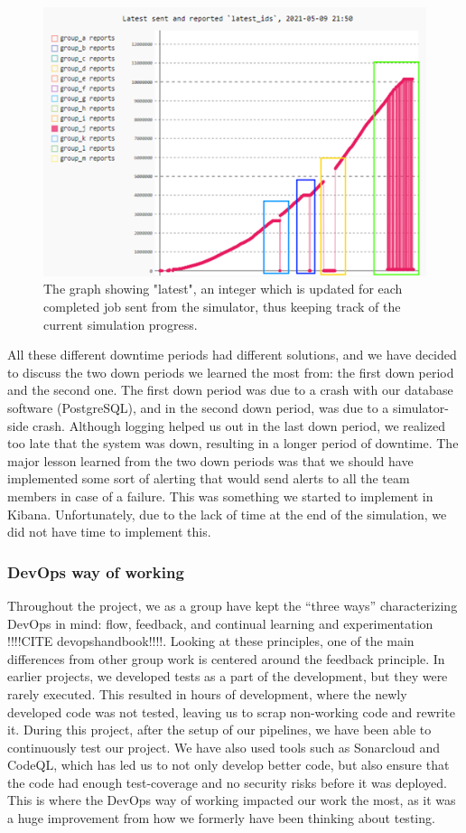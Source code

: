 \begin{figure}[h!]
    \centering
    \includegraphics[scale=0.7]{images/downperiodes.png}
    \caption{The graph showing "latest", an integer which is updated for each completed job sent from the simulator, 
    thus keeping track of the current simulation progress. }
\end{figure}
 
All these different downtime periods had different solutions, and we have decided to discuss the two down periods we 
learned the most from: the first down period and the second one. 
The first down period was due to a crash with our database software (PostgreSQL), and in the second down period, 
was due to a simulator-side crash. Although logging helped us out in the last down period, 
we realized too late that the system was down, resulting in a longer period of downtime. 
The major lesson learned from the two down periods was that we should have implemented some sort of alerting 
that would send alerts to all the team members in case of a failure. This was something we started to 
implement in Kibana. Unfortunately, due to the lack of time at the end of the simulation, we did not have time to implement this.

\subsubsection{DevOps way of working}
Throughout the project, we as a group have kept the “three ways” characterizing DevOps in mind: 
flow, feedback, and continual learning and experimentation !!!!CITE devopshandbook!!!!. 
Looking at these principles, one of the main differences from other group work is centered around 
the feedback principle. In earlier projects, we developed tests as a part of the development, 
but they were rarely executed. This resulted in hours of development, where the newly developed code was 
not tested, leaving us to scrap non-working code and rewrite it. 
During this project, after the setup of our pipelines, we have been able to continuously test our project. 
We have also used tools such as Sonarcloud and CodeQL, which has led us to not only develop better code, 
but also ensure that the code had enough test-coverage and no security risks before it was deployed. 
This is where the DevOps way of working impacted our work the most, as it was a huge improvement 
from how we formerly have been thinking about testing.
